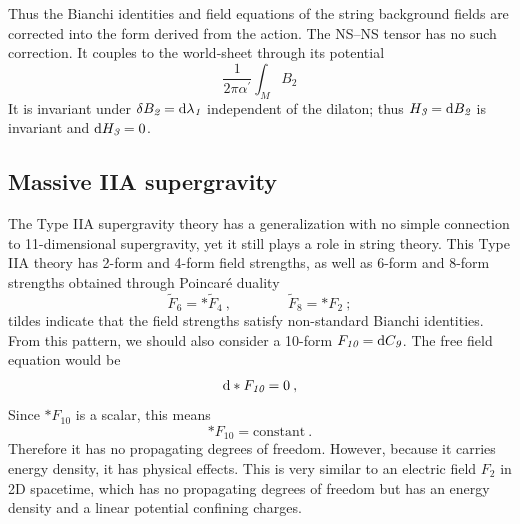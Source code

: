 Thus the Bianchi identities and field equations of the string background fields are corrected into the form derived from the action. The NS--NS tensor has no such correction. It couples to the world-sheet through its potential
\begin{equation}
	\frac{1}{2\pi\alpha^{\prime}} \int_{M}B_{\textit{2}} \label{12.1.20}
\end{equation}
It is invariant under $\delta B_{\textit{2}}=\mathrm{d}\lambda_{\textit{1}}$ independent of the dilaton; thus $H_{\textit{3}}=\mathrm{d} B_{\textit{2}}$ is invariant and $\mathrm{d} H_{\textit{3}}=0$.

\subsection*{Massive IIA supergravity}

The Type IIA supergravity theory has a generalization with no simple connection to 11-dimensional supergravity, yet it still plays a role in string theory. This Type IIA theory has 2-form and 4-form field strengths, as well as 6-form and 8-form strengths obtained through Poincaré duality
\begin{equation}
	\tilde{F}_{\textit{6}}=\ast\tilde{F}_{\textit{4}}\:,\qquad \qquad 
	\tilde{F}_{\textit{8}}=\ast F_{\textit{2}}\:; \label{12.1.21}
\end{equation}
tildes indicate that the field strengths satisfy non-standard Bianchi identities. From this pattern, we should also consider a 10-form $F_{\textit{10}}=\mathrm{d} C_{\textit{9}}$. The free field equation would be
\begin{equation}
	\mathrm{d} \ast F_{\textit{10}} =0 \:, \label{12.1.22}
\end{equation}
Since $\ast F_{\textit{10}}$ is a scalar, this means
\begin{equation}
	\ast F_{\textit{10}} = \text{constant}\:. \label{12.1.23}
\end{equation}
Therefore it has no propagating degrees of freedom. However, because it carries energy density, it has physical effects. This is very similar to an electric field $F_{\textit{2}}$ in 2D spacetime, which has no propagating degrees of freedom but has an energy density and a linear potential confining charges.

